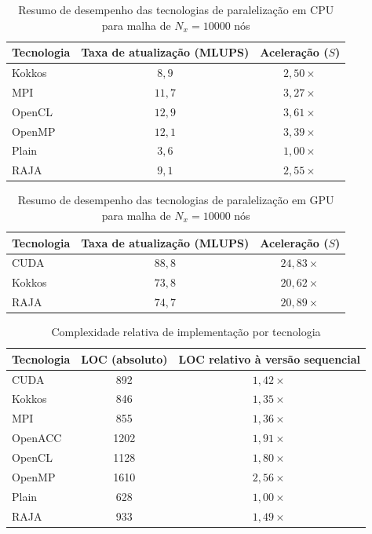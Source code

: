 \begin{table}[H]
    \centering
    \caption{Resumo de desempenho das tecnologias de paralelização em CPU para malha de \(N_x=10000\) nós}
    \label{tab:desempenho-cpu-tecnologias}
    \begin{tabular}{lcc}
        \toprule
        Tecnologia & Taxa de atualização (MLUPS) & Aceleração (\(S\)) \\
        \midrule
        Kokkos & \(8{,}9\) & \(2{,}50\times\) \\
        MPI & \(11{,}7\) & \(3{,}27\times\) \\
        OpenCL & \(12{,}9\) & \(3{,}61\times\) \\
        OpenMP & \(12{,}1\) & \(3{,}39\times\) \\
        Plain & \(3{,}6\) & \(1{,}00\times\) \\
        RAJA & \(9{,}1\) & \(2{,}55\times\) \\
        \bottomrule
    \end{tabular}
\end{table}

\begin{table}[H]
    \centering
    \caption{Resumo de desempenho das tecnologias de paralelização em GPU para malha de \(N_x=10000\) nós}
    \label{tab:desempenho-gpu-tecnologias}
    \begin{tabular}{lcc}
        \toprule
        Tecnologia & Taxa de atualização (MLUPS) & Aceleração (\(S\)) \\
        \midrule
        CUDA & \(88{,}8\) & \(24{,}83\times\) \\
        Kokkos & \(73{,}8\) & \(20{,}62\times\) \\
        RAJA & \(74{,}7\) & \(20{,}89\times\) \\
        \bottomrule
    \end{tabular}
\end{table}

\begin{table}[H]
    \centering
    \caption{Complexidade relativa de implementação por tecnologia}
    \label{tab:complexidade-loc-tecnologias}
    \begin{tabular}{lcc}
        \toprule
        Tecnologia & LOC (absoluto) & LOC relativo à versão sequencial \\
        \midrule
        CUDA & 892 & \(1{,}42\times\) \\
        Kokkos & 846 & \(1{,}35\times\) \\
        MPI & 855 & \(1{,}36\times\) \\
        OpenACC & 1202 & \(1{,}91\times\) \\
        OpenCL & 1128 & \(1{,}80\times\) \\
        OpenMP & 1610 & \(2{,}56\times\) \\
        Plain & 628 & \(1{,}00\times\) \\
        RAJA & 933 & \(1{,}49\times\) \\
        \bottomrule
    \end{tabular}
\end{table}
